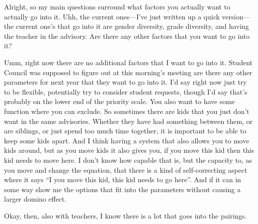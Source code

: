 \documentclass[appendix.tex]{subfiles}
\begin{document}
Alright, so my main questions surround what factors you actually want to actually go into it.
Uhh, the current ones---I've just written up a quick version---the current one's that go into it are gender diversity, grade diversity, and having the teacher in the advisory.
Are there any other factors that you want to go into it?

Umm, right now there are no additional factors that I want to go into it.
Student Council was supposed to figure out at this morning's meeting are there any other parameters for next year that they want to go into it.
I'd say right now just try to be flexible, potentially try to consider student requests, though I'd say that's probably on the lower end of the priority scale.
You also want to have some function where you can exclude.
So sometimes there are kids that you just don't want in the same advisories.
Whether they have had something between them, or are siblings, or just spend too much time together, it is important to be able to keep some kids apart.
And I think having a system that also allows you to move kids around, but as you move kids it also gives you, if you move this kid then this kid needs to move here.
I don't know how capable that is, but the capacity to, as you move and change the equation, that there is a kind of self-correcting aspect where it says \enquote{I you move this kid, this kid needs to go here}.
And if it can in some way show me the options that fit into the parameters without causing a larger domino effect.

Okay, then, also with teachers, I know there is a lot that goes into the pairings.
\end{document}
